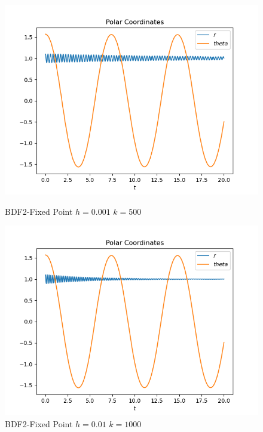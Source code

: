 \documentclass{report}
\begin{document}
\begin{figure}[h]
\centering
\begin{minipage}[b]{0.45\textwidth}
\centering
\includegraphics[width=\textwidth]{../Plots/BDF2/bdf2_h=0.01_k=500_c}
\caption{BDF2-Fixed Point $h=0.001$ $k=500$}
\label{exp_euler_k=50_h=0.001_c}
\end{minipage}
\hfill
\begin{minipage}[b]{0.45\textwidth}
\centering
\includegraphics[width=\textwidth]{../Plots/BDF2/bdf2_h=0.01_k=1000_c}
\caption{BDF2-Fixed Point $h=0.01$ $k=1000$}
\label{bdf2_h=00.1_k=1000_c}
\end{minipage}
\end{figure}
\end{document}
